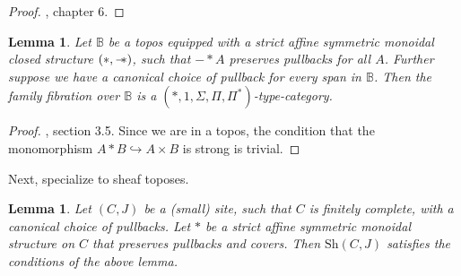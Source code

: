 \documentclass{article}
\newtheorem{lemma}[theorem]{Lemma}
\newcommand*{\Sh}{\mathrm{Sh}}
\newcommand*{\B}{\mathbb{B}}
\newcommand*{\wand}{\mathbin{-\mkern-6mu*}}
\begin{document}
\begin{proof}
    \cite{schopp}, chapter 6.
\end{proof}

\begin{lemma}
    Let \(\B\) be a topos equipped with a strict affine symmetric monoidal closed structure \((*,\wand)\),
    such that \(- * A\) preserves pullbacks for all \(A\).
    Further suppose we have a canonical choice of pullback for every span in \(\B\).
    Then the family fibration over \(\B\) is a \((*, 1, \Sigma, \Pi, \Pi^*)\)-type-category.
\end{lemma}

\begin{proof}
    \cite{schopp}, section 3.5. Since we are in a topos, the condition that the monomorphism \(A * B \hookrightarrow A \times B\) is strong is trivial.
\end{proof}

Next, specialize to sheaf toposes.

\begin{lemma} \label{sh}
    Let \((C,J)\) be a (small) site, such that \(C\) is finitely complete,
    with a canonical choice of pullbacks.
    Let \(*\) be a strict affine symmetric monoidal structure on \(C\) that preserves pullbacks and covers.
    Then \(\Sh(C,J)\) satisfies the conditions of the above lemma.
\end{lemma}
\end{document}
